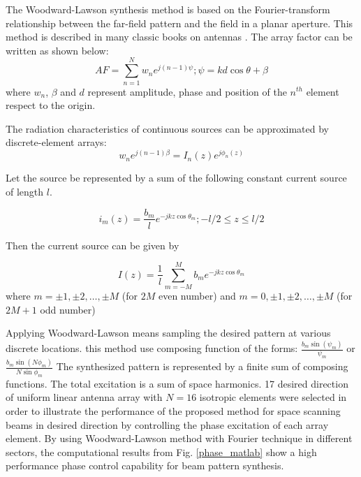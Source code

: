\documentclass[conference]{IEEEtran}
\begin{document}
The Woodward-Lawson synthesis method \cite{WWL3} is based on the Fourier-transform relationship between the far-field pattern and the field in a planar aperture. This method is described in many classic books on antennas \cite{WWL6}. The array factor can be written as shown below:
\begin{equation}
AF = \sum\limits_{n = 1}^N {w_n e^{j\left( {n - 1} \right)\psi } }; \psi  = kd\cos \theta  + \beta  
\end{equation}
where $w_n$, $\beta$ and $d$ represent amplitude, phase and position of the $n^{th}$ element respect to the origin.

The radiation characteristics of continuous sources can be approximated by discrete-element arrays:
\begin{equation}
w_n e^{j\left( {n - 1} \right)\beta }  = I_n (z)e^{j\phi _n \left( z \right)}
\end{equation}

Let the source be represented by a sum of the following constant current source of length $l$.

\begin{equation}
i_m \left( z \right) = \frac{{b_m }}{l}e^{ - jkz\cos \theta _m } ; - l/2 \le z \le l/2
\end{equation}

Then the current source can be given by

\begin{equation}
I\left( z \right) = \frac{1}{l}\sum\limits_{m =  - M}^M {b_m } e^{ - jkz\cos \theta _m } 
\end{equation}
where $m =  \pm 1, \pm 2, \ldots , \pm M$ (for $2M$ even number) and $m =  0, \pm 1, \pm 2, \ldots , \pm M$ (for $2M+1$ odd number) 
\begin{figure} [!ht]
\end{figure}

Applying Woodward-Lawson means sampling the desired pattern at various discrete locations. this method use composing function of the forms: $\frac{{b_m \sin \left( {\psi _m } \right)}}{{\psi _m }}$ or $\frac{{b_m \sin \left( {N\phi _m } \right)}}{{N\sin \phi _m }}$ The synthesized pattern is represented by a finite sum of composing functions. The total excitation is a sum of space harmonics. 17 desired direction of uniform linear antenna array with $N=16$ isotropic elements were selected in order to illustrate the performance of the proposed method for space scanning beams in desired direction by controlling the phase excitation of each array element. By using Woodward-Lawson method with Fourier technique in different sectors, the computational results from Fig. \ref{phase_matlab} show a high performance phase control capability for beam pattern synthesis.
\end{document}
